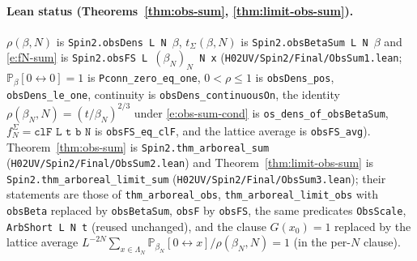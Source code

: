 \documentclass[11pt]{amsart}
\theoremstyle{definition}
\theoremstyle{remark}
\numberwithin{equation}{section}
\newcommand{\conn}{\leftrightarrow}
\begin{document}
\paragraph{Lean status (Theorems~\ref{thm:obs-sum}, \ref{thm:limit-obs-sum}).}
$\rho(\beta,N)$ is \texttt{Spin2.obsDens L N $\beta$}, $t_\Sigma(\beta,N)$ is \texttt{Spin2.obsBetaSum L N $\beta$} and
\eqref{e:fN-sum} is \texttt{Spin2.obsFS L $(\beta_N)_N$ N x} (\texttt{H02UV/Spin2/Final/ObsSum1.lean}; $\mathbb{P}_\beta[0\conn0]=1$ is
\texttt{Pconn\_zero\_eq\_one}, $0<\rho\le1$ is \texttt{obsDens\_pos}, \texttt{obsDens\_le\_one}, continuity is
\texttt{obsDens\_continuousOn}, the identity $\rho(\beta_N,N)=(t/\beta_N)^{2/3}$ under \eqref{e:obs-sum-cond} is
\texttt{os\_dens\_of\_obsBetaSum}, $f^\Sigma_N=\texttt{clF L t b N}$ is \texttt{obsFS\_eq\_clF}, and the lattice average is
\texttt{obsFS\_avg}). Theorem~\ref{thm:obs-sum} is \texttt{Spin2.thm\_arboreal\_sum} (\texttt{H02UV/Spin2/Final/ObsSum2.lean}) and
Theorem~\ref{thm:limit-obs-sum} is \texttt{Spin2.thm\_arboreal\_limit\_sum} (\texttt{H02UV/Spin2/Final/ObsSum3.lean}); their
statements are those of \texttt{thm\_arboreal\_obs}, \texttt{thm\_arboreal\_limit\_obs} with \texttt{obsBeta} replaced by
\texttt{obsBetaSum}, \texttt{obsF} by \texttt{obsFS}, the same predicates \texttt{ObsScale}, \texttt{ArbShort L N t}
(reused unchanged), and the clause $G(x_0)=1$ replaced by the lattice average
$L^{-2N}\sum_{x\in\Lambda_N}\mathbb{P}_{\beta_N}[0\conn x]/\rho(\beta_N,N)=1$ (in the per-$N$ clause).
\end{document}
